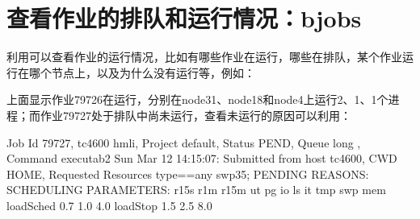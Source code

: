 \documentclass[a4paper,12pt,english]{sphinxmanual}
\begin{document}
\sphinxAtStartPar
{}

\begin{sphinxVerbatim}[commandchars=\\\{\}]
      
\end{sphinxVerbatim}


\section{查看作业的排队和运行情况：bjobs}
\label{\detokenize{lsf/lsf:bjobs}}
\sphinxAtStartPar
利用可以查看作业的运行情况，比如有哪些作业在运行，哪些在排队，某个作业运行在哪个节点上，以及为什么没有运行等，例如：

\sphinxAtStartPar
{}

\begin{sphinxVerbatim}[commandchars=\\\{\}]
                
                    
                             
\end{sphinxVerbatim}

\sphinxAtStartPar
上面显示作业79726在运行，分别在node31、node18和node4上运行2、1、1个进程；而作业79727处于排队中尚未运行，查看未运行的原因可以利用：

\sphinxAtStartPar
{}

\begin{sphinxVerbatim}[commandchars=\\\{\}]
Job Id \PYGZlt{}79727\PYGZgt{}, tc4600 \PYGZlt{}hmli\PYGZgt{}, Project \PYGZlt{}default\PYGZgt{}, Status \PYGZlt{}PEND\PYGZgt{},
Queue \PYGZlt{}long\PYGZgt{} , Command \PYGZlt{}executab2\PYGZgt{}
Sun Mar 12 14:15:07: Submitted from host \PYGZlt{}tc4600\PYGZgt{},
CWD \PYGZlt{}\PYGZdl{}HOME\PYGZgt{}, Requested Resources \PYGZlt{}type==any \PYGZam{}\PYGZam{} swp\PYGZgt{}35\PYGZgt{};
PENDING REASONS:
SCHEDULING PARAMETERS:
            r15s r1m r15m  ut pg   io  ls   it   tmp   swp   mem
loadSched   \PYGZhy{}    0.7 1.0   \PYGZhy{} 4.0   \PYGZhy{}   \PYGZhy{}    \PYGZhy{}    \PYGZhy{}     \PYGZhy{}     \PYGZhy{}
loadStop    \PYGZhy{}    1.5 2.5   \PYGZhy{} 8.0   \PYGZhy{}   \PYGZhy{}    \PYGZhy{}    \PYGZhy{}     \PYGZhy{}     \PYGZhy{}
\end{sphinxVerbatim}
\end{document}
